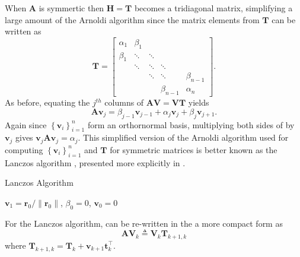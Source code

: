 When $\bm{A}$ is symmertic then $\bm{H} = \bm{T}$ becomes a tridiagonal matrix, simplifying a large amount of the Arnoldi algorithm since the matrix elements from $\bm{T}$ can be written as
\[
    \bm{T} =
    \begin{bmatrix}
        \alpha_1 & \beta_1 &        &             &             \\
        \beta_1  & \ddots  & \ddots &             &             \\
                 & \ddots  & \ddots & \ddots      &             \\
                 &         & \ddots & \ddots      & \beta_{n-1} \\
                 &         &        & \beta_{n-1} & \alpha_{n}
    \end{bmatrix}.
\]
As before, equating the $j^{th}$ columns of $\bm{A} \bm{V} = \bm{V} \bm{T}$ yields
\begin{equation}\label{eq: lancz_orth_basis}
    \bm{A} \bm{v}_{j} = \beta_{j-1} \bm{v}_{j-1} + \alpha_{j} \bm{v}_j + \beta_j \bm{v}_{j+1}.
\end{equation}
Again since $\left\{ \bm{v}_{i} \right\}_{i=1}^{n}$ form an orthornormal basis, multiplying both sides of  by $\bm{v}_j$ gives $\bm{v}_j \bm{A} \bm{v}_j = \alpha_j$. This simplified version of the Arnoldi algorithm used for computing $\left\{ \bm{v}_{i} \right\}_{i=1}^{n}$ and $\bm{T}$ for symmetric matrices is better known as the Lanczos algorithm \cite{DemmelJamesW1997Anla}, presented more explicitly in .

{\centering
\begin{minipage}{.85\linewidth}
    \begin{algorithm}[H]
        \caption{Lanczos Algorithm}
        \label{alg: Lanczos_Algorithm}
        \SetAlgoLined
        \DontPrintSemicolon

        \BlankLine
        $\bm{v}_1 = \bm{r}_0 / \| \bm{r}_0 \|$, $\beta_0 = 0$, $\bm{v}_0 = 0$\;
        \BlankLine
    \end{algorithm}
\end{minipage}
\par
}

For the Lanczos algorithm,  can be re-written in the a more compact form as
\begin{equation}\label{eq: AVk_eq_VkTk1k}
    \bm{A} \bm{V}_{k} \triangleq \bm{V}_{k} \bm{T}_{k+1,k}
\end{equation}
where $\bm{T}_{k+1,k} = \bm{T}_{k} + \bm{v}_{k+1} \bm{t}_{k}^{\intercal}$.